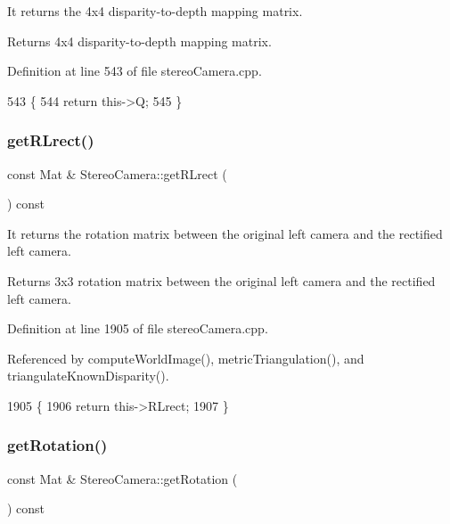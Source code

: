 It returns the 4x4 disparity-\/to-\/depth mapping matrix. 

\begin{DoxyReturn}{Returns}
4x4 disparity-\/to-\/depth mapping matrix. 
\end{DoxyReturn}


Definition at line 543 of file stereo\+Camera.\+cpp.


\begin{DoxyCode}
543                                     \{
544     \textcolor{keywordflow}{return} this->Q;
545 \}
\end{DoxyCode}
\mbox{\label{classStereoCamera_ab3adb747963c617fd2fe1a919b0c59c7}} 
\subsubsection{\texorpdfstring{get\+R\+Lrect()}{getRLrect()}}
{\footnotesize\ttfamily const Mat \& Stereo\+Camera\+::get\+R\+Lrect (\begin{DoxyParamCaption}{ }\end{DoxyParamCaption}) const}



It returns the rotation matrix between the original left camera and the rectified left camera. 

\begin{DoxyReturn}{Returns}
3x3 rotation matrix between the original left camera and the rectified left camera. 
\end{DoxyReturn}


Definition at line 1905 of file stereo\+Camera.\+cpp.



Referenced by compute\+World\+Image(), metric\+Triangulation(), and triangulate\+Known\+Disparity().


\begin{DoxyCode}
1905                                          \{
1906     \textcolor{keywordflow}{return} this->RLrect;
1907 \}
\end{DoxyCode}
\mbox{\label{classStereoCamera_a08b520f9976fc3213047844fedc02a54}} 
\subsubsection{\texorpdfstring{get\+Rotation()}{getRotation()}}
{\footnotesize\ttfamily const Mat \& Stereo\+Camera\+::get\+Rotation (\begin{DoxyParamCaption}{ }\end{DoxyParamCaption}) const}



